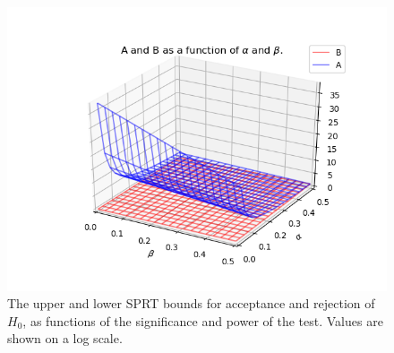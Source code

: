 \begin{figure}
    \centering
    \includegraphics[width = 0.75\linewidth]{Chapters/MultiAgentTargetDetection/Figs/SearchTermination/AandBAsFunctionOfAlphaAndBeta.png}
    \caption{The upper and lower SPRT bounds for acceptance and rejection of $H_0$, as functions of the significance and power of the test. Values are shown on a log scale.}
    \label{fig:SPRTCutoffFunctionOfAlphaAndBeta}
\end{figure}



